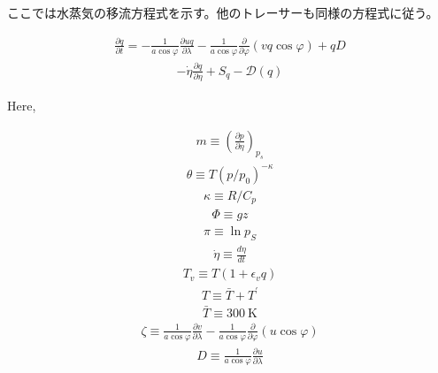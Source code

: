 ここでは水蒸気の移流方程式を示す。他のトレーサーも同様の方程式に従う。

\begin{eqnarray}
  \frac{\partial q}{\partial t}
   =  - \frac{1}{a\cos\varphi}
               \frac{\partial uq}{\partial \lambda}
          - \frac{1}{a\cos\varphi}
               \frac{\partial }{\partial \varphi} (vq \cos\varphi)
          + q D
\end{eqnarray} \begin{eqnarray}
        - \dot{\eta} \frac{\partial q }{\partial \eta}
          + S_{q}
          - {\mathcal D}(q) 
\end{eqnarray}

Here,

\begin{eqnarray}
m \equiv \left(\frac{\partial p}{\partial \eta}\right)_{p_s}
\end{eqnarray} \begin{eqnarray}
\theta  \equiv  T \left( p/p_{0} \right)^{-\kappa}
\end{eqnarray} \begin{eqnarray}
\kappa  \equiv  R/C_{p}
\end{eqnarray} \begin{eqnarray}
  \Phi  \equiv  gz
\end{eqnarray} \begin{eqnarray}
   \pi  \equiv  \ln p_{S}
\end{eqnarray} \begin{eqnarray}
 \dot{\eta}  \equiv   \frac{d \eta}{d t}
\end{eqnarray} \begin{eqnarray}
     T_v  \equiv  T ( 1+\epsilon_v q )
\end{eqnarray} \begin{eqnarray}
     T  \equiv   \bar{T} + T^{\prime}
\end{eqnarray} \begin{eqnarray}
     \bar{T}\equiv 300 \ \mathrm{K}
\end{eqnarray} \begin{eqnarray}
 \zeta  \equiv  \frac{1}{a \cos\varphi }
                    \frac{\partial v}{\partial \lambda} 
             -    \frac{1}{a \cos\varphi }
                    \frac{\partial }{\partial \varphi}
                    ( u \cos\varphi )
\end{eqnarray} \begin{eqnarray}
     D  \equiv  \frac{1}{a \cos\varphi }
                    \frac{\partial u}{\partial \lambda} 

\end{eqnarray}

